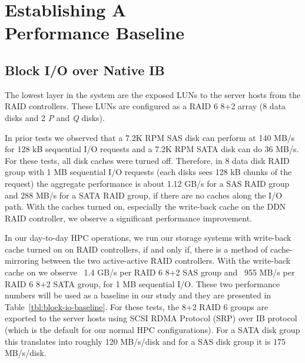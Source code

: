 \section{Establishing A \\Performance Baseline}
\label{sec:baseline}

\subsection{Block I/O over Native IB} 
\label{sec:block-io}

The lowest layer in the system are the exposed LUNs to the server hosts from
the RAID controllers.  These LUNs are configured as a RAID 6 8+2 array (8 data
disks and 2 \textit{P} and \textit{Q} disks). 

In prior tests we observed
that a 7.2K RPM SAS disk can perform at 140 MB/s for 128 kB
sequential I/O requests and a 7.2K RPM SATA disk can do 36 MB/s.
For these tests, all disk caches were turned off. Therefore, in 8 data disk
RAID group with 1 MB sequential I/O requests (each disks sees 128 kB chunks of
the request) the aggregate performance is about 1.12
GB/s for a SAS RAID group and 288 MB/s for a SATA RAID group, if
there are no caches along the I/O path.  With the caches turned on, especially
the write-back cache on the DDN RAID controller, we observe a significant
performance improvement. 

In our day-to-day HPC operations, we run our storage
systems with write-back cache turned on on RAID controllers, if and only if,
there is a method of cache-mirroring between the two active-active RAID
controllers. With the write-back cache on we observe \string~1.4 GB/s
per RAID 6 8+2 SAS group and  \string~955 MB/s per RAID 6 8+2 SATA
group, for 1 MB sequential I/O.  These two performance numbers will be used as
a baseline in our study and they are presented in
Table~\ref{tbl:block-io-baseline}.  For these tests, the 8+2 RAID 6 groups are
exported to the server hosts using SCSI RDMA Protocol (SRP) over IB protocol
(which is the default for our normal HPC configurations). For a SATA disk group
this translates into roughly 120 MB/s/disk and for a SAS disk group it is 175
MB/s/disk. 




